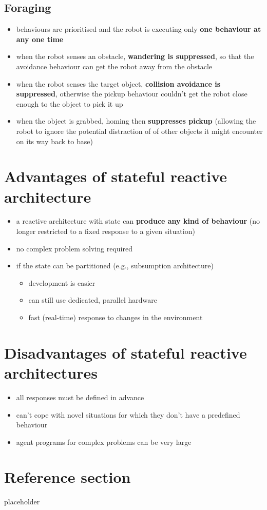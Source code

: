\documentclass{article}
\begin{document}
\subsection{Foraging}
\begin{itemize}
  \item behaviours are prioritised and the robot is executing only \textbf{one behaviour at any one time} 
  \item when the robot senses an obstacle, \textbf{wandering is suppressed}, so that the avoidance behaviour can get the robot away from the obstacle 
  \item when the robot senses the target object, \textbf{collision avoidance is suppressed}, otherwise the pickup behaviour couldn’t get the robot close enough to the object to pick it up 
  \item when the object is grabbed, homing then \textbf{suppresses pickup} (allowing the robot to ignore the potential distraction of of other objects it might encounter on its way back to base)
\end{itemize}

\section{Advantages of stateful reactive architecture}
\begin{itemize}
  \item a reactive architecture with state can \textbf{produce any kind of behaviour} (no longer restricted to a fixed response to a given situation) 
  \item no complex problem solving required 
  \item if the state can be partitioned (e.g., subsumption architecture)
  \begin{itemize}
    \item development is easier 
    \item can still use dedicated, parallel hardware
    \item fast (real-time) response to changes in the environment
  \end{itemize}
\end{itemize}

\section{Disadvantages of stateful reactive architectures}
\begin{itemize}
  \item all responses must be defined in advance 
  \item can’t cope with novel situations for which they don’t have a predefined behaviour 
  \item agent programs for complex problems can be very large
\end{itemize}

\pagebreak
\section*{Reference section} \label{sec:reference}
\begin{description}
	\item[placeholder] \hfill \\
\end{description}
\end{document}
